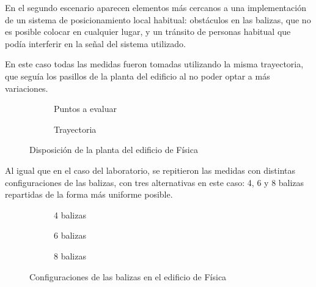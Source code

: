 En el segundo escenario aparecen elementos más cercanos a una implementación de un sistema de posicionamiento local habitual: obstáculos en las balizas, que no es posible colocar en cualquier lugar, y un tránsito de personas habitual que podía interferir en la señal del sistema utilizado.

En este caso todas las medidas fueron tomadas utilizando la misma trayectoria, que seguía los pasillos de la planta del edificio al no poder optar a más variaciones.

\begin{figure}[H]
  \begin{subfigure}[b]{.5\textwidth}
    \centering
    \def\svgwidth{0.75\linewidth}
     
    \caption{Puntos a evaluar}
    \label{fig:puntos_fisica}
  \end{subfigure}
  \begin{subfigure}[b]{.5\textwidth}
    \centering
    \def\svgwidth{0.75\linewidth}
     
    \caption{Trayectoria}
    \label{fig:trayecto_fisica}
  \end{subfigure}
  \caption{Disposición de la planta del edificio de Física}
  \label{fig:fisica}
\end{figure}

Al igual que en el caso del laboratorio, se repitieron las medidas con distintas configuraciones de las balizas, con tres alternativas en este caso: 4, 6 y 8 balizas repartidas de la forma más uniforme posible.

\begin{figure}[H]
  \begin{subfigure}[b]{.3\textwidth}
    \centering
    \def\svgwidth{0.9\linewidth}
     
    \caption{4 balizas}
    \label{fig:puntos}
  \end{subfigure}
  \begin{subfigure}[b]{.3\textwidth}
    \centering
    \def\svgwidth{0.9\linewidth}
      
    \caption{6 balizas}
    \label{fig:espiral}
  \end{subfigure}
  \begin{subfigure}[b]{.3\textwidth}
      \centering
      \def\svgwidth{0.9\linewidth}
        
      \caption{8 balizas}
      \label{fig:vertical}
    \end{subfigure}
  \caption{Configuraciones de las balizas en el edificio de Física}
  \label{fig:sensores_fisica}
\end{figure}


